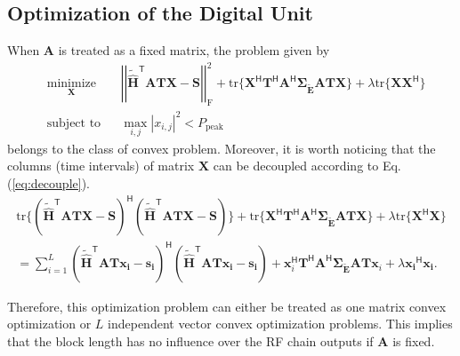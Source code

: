 \documentclass[12pt,draftclsnofoot,onecolumn,journal]{IEEEtran}
\begin{document}
\subsection{Optimization of the Digital Unit}
When $\mathbf A$ is treated as a fixed matrix, the problem given by
\begin{equation}
\begin{aligned}
& \underset{\mathbf X}{\text{minimize}}
& &\left|\left|\tilde{\hat{\mathbf H}}^{\mathsf T}\mathbf{ATX}-\mathbf{S}\right|\right|_{\mathrm{F}}^2+\mathrm{tr}\{\mathbf X^{\mathsf H}\mathbf T^{\mathsf H}\mathbf A^{\mathsf H}
\pmb{\Sigma_{\tilde{\mathbf E}}}\mathbf{ATX}\}+\lambda\mathrm{tr}\{\mathbf X\mathbf X^{\mathsf H}\}\\
& \text{subject to}
& &\max_{i,j} |x_{i,j}|^2<P_{\mathrm{peak}}
\label{opt:rfcopt}
\end{aligned}
\end{equation}
belongs to the class of convex problem. Moreover, it is worth noticing that the columns (time intervals) of matrix $\mathbf X$ can be decoupled according to Eq. (\ref{eq:decouple}).
\begin{equation}
\begin{split}
\mathrm{tr}\{(\tilde{\hat{\mathbf H}}^{\mathsf T}\mathbf{ATX}-\mathbf{S})^{\mathsf H}(\tilde{\hat{\mathbf H}}^{\mathsf T}\mathbf{ATX}-\mathbf{S})\}+\mathrm{tr}\{\mathbf X^{\mathsf H}\mathbf T^{\mathsf H}\mathbf A^{\mathsf H}
\pmb{\Sigma_{\tilde{\mathbf E}}}\mathbf{ATX}\}+\lambda \mathrm{tr}\{\mathbf{X}^{\mathsf H}\mathbf{X}\}\\
=\sum_{i=1}^L(\tilde{\hat{\mathbf H}}^{\mathsf T}\mathbf{AT}\boldsymbol{x_i}-\boldsymbol{s_i})^{\mathsf H}(\tilde{\hat{\mathbf H}}^{\mathsf T}\mathbf{AT}\boldsymbol{x_i}-\boldsymbol{s_i})+
\mathbf x_i^{\mathsf H}\mathbf T^{\mathsf H}\mathbf A^{\mathsf H}
\pmb{\Sigma_{\tilde{\mathbf E}}}\mathbf{ATx}_i
+\lambda \boldsymbol{x_i}^{\mathsf H}\boldsymbol{x_i}.
\label{eq:decouple}
\end{split}
\end{equation}

Therefore, this optimization problem can either be treated as one matrix convex optimization or $L$ independent vector convex optimization problems. This implies that the block length has no influence over the RF chain outputs if $\mathbf A$ is fixed. 
\end{document}
